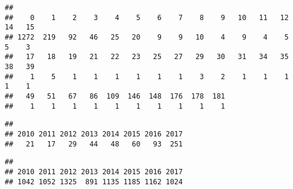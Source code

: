 \documentclass[]{article}
\newenvironment{Shaded}{\begin{snugshade}}{\end{snugshade}}
\newcommand{\KeywordTok}[1]{\textcolor[rgb]{0.13,0.29,0.53}{\textbf{#1}}}
\newcommand{\CommentTok}[1]{\textcolor[rgb]{0.56,0.35,0.01}{\textit{#1}}}
\newcommand{\ControlFlowTok}[1]{\textcolor[rgb]{0.13,0.29,0.53}{\textbf{#1}}}
\newcommand{\OperatorTok}[1]{\textcolor[rgb]{0.81,0.36,0.00}{\textbf{#1}}}
\newcommand{\NormalTok}[1]{#1}
\begin{document}
\begin{verbatim}
## 
##    0    1    2    3    4    5    6    7    8    9   10   11   12   14   15 
## 1272  219   92   46   25   20    9    9   10    4    9    4    5    5    3 
##   17   18   19   21   22   23   25   27   29   30   31   34   35   38   39 
##    1    5    1    1    1    1    1    1    3    2    1    1    1    1    1 
##   49   51   67   86  109  146  148  176  178  181 
##    1    1    1    1    1    1    1    1    1    1
\end{verbatim}

\begin{Shaded}
\end{Shaded}

\begin{verbatim}
## 
## 2010 2011 2012 2013 2014 2015 2016 2017 
##   21   17   29   44   48   60   93  251
\end{verbatim}

\begin{Shaded}
\end{Shaded}

\begin{verbatim}
## 
## 2010 2011 2012 2013 2014 2015 2016 2017 
## 1042 1052 1325  891 1135 1185 1162 1024
\end{verbatim}

\begin{Shaded}
\end{Shaded}
\end{document}
